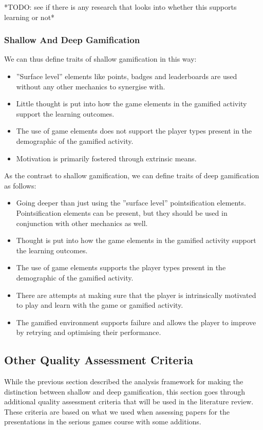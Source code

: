 *TODO: see if there is any research that looks into whether this supports learning or not*

\subsubsection{Shallow And Deep Gamification}
We can thus define traits of shallow gamification in this way:
\begin{itemize}
    \item ''Surface level'' elements like points, badges and leaderboards are used without any other mechanics to synergise with.
    \item Little thought is put into how the game elements in the gamified activity support the learning outcomes. 
    \item The use of game elements does not support the player types present in the demographic of the gamified activity.
    \item Motivation is primarily fostered through extrinsic means. 
\end{itemize}

As the contrast to shallow gamification, we can define traits of deep gamification as follows:
\begin{itemize}
    \item Going deeper than just using the ''surface level'' pointsification elements. Pointsification elements can be present, but they should be used in conjunction with other mechanics as well. 
    \item Thought is put into how the game elements in the gamified activity support the learning outcomes.
    \item The use of game elements supports the player types present in the demographic of the gamified activity.
    \item There are attempts at making sure that the player is intrinsically motivated to play and learn with the game or gamified activity. 
    \item The gamified environment supports failure and allows the player to improve by retrying and optimising their performance. 
\end{itemize}


\subsection{Other Quality Assessment Criteria}
While the previous section described the analysis framework for making the distinction between shallow and deep gamification, this section goes through additional quality assessment criteria that will be used in the literature review. These criteria are based on what we used when assessing papers for the presentations in the serious games course with some additions. 

